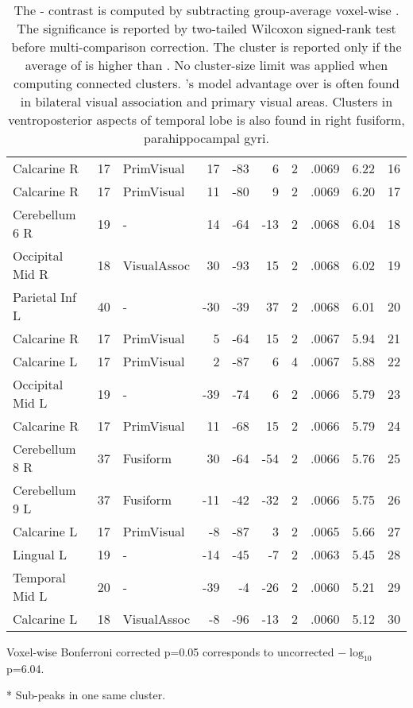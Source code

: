 \begin{table}
\begin{ThreePartTable}
\begin{tabularx}{\textwidth}{l l p{1.5cm} *{3}{r} *{2}{P{.8cm}} P{1.3cm} P{.5cm}}
Calcarine R & 17 & PrimVisual & 17 & -83 & 6 & 2 &  .0069  & 6.22 & 16 \\
Calcarine R & 17 & PrimVisual & 11 & -80 & 9 & 2 &  .0069  & 6.20 & 17 \\
Cerebellum 6 R & 19 & - & 14 & -64 & -13 & 2 &  .0068 & 6.04  & 18 \\
\midrule
Occipital Mid R & 18 & VisualAssoc & 30 & -93 & 15 & 2 &  .0068 & 6.02  & 19 \\
Parietal Inf L & 40 & - & -30 & -39 & 37 & 2 &  .0068 & 6.01 & 20 \\
Calcarine R & 17 & PrimVisual & 5 & -64 & 15 & 2 &  .0067& 5.94  & 21 \\
Calcarine L & 17 & PrimVisual & 2 & -87 & 6 & 4 &  .0067 & 5.88 & 22 \\
Occipital Mid L & 19 & - & -39 & -74 & 6 & 2 &  .0066 & 5.79 & 23 \\
Calcarine R & 17 & PrimVisual & 11 & -68 & 15 & 2 &  .0066 & 5.79 & 24 \\
Cerebellum 8 R & 37 & Fusiform & 30 & -64 & -54 & 2 &  .0066 & 5.76 & 25 \\
Cerebellum 9 L & 37 & Fusiform & -11 & -42 & -32 & 2 &  .0066 & 5.75& 26 \\
Calcarine L & 17 & PrimVisual & -8 & -87 & 3 & 2 &  .0065 & 5.66 & 27 \\
Lingual L & 19 & - & -14 & -45 & -7 & 2 &  .0063 & 5.45 & 28 \\
Temporal Mid L & 20 & - & -39 & -4 & -26 & 2 &  .0060 & 5.21 & 29 \\
Calcarine L & 18 & VisualAssoc & -8 & -96 & -13 & 2 &  .0060 & 5.12 & 30 \\
\bottomrule
    \end{tabularx}
    \begin{tablenotes}
        \footnotesize
        \item[] Voxel-wise Bonferroni corrected p=0.05 corresponds to uncorrected \(-\log_{10}\) p=6.04.
        \item[*] Sub-peaks in one same cluster. 
    \end{tablenotes}  
\end{ThreePartTable}
\caption[ Voxel Contrast, , Group]{The - contrast is computed by subtracting group-average voxel-wise . The significance is reported by two-tailed Wilcoxon signed-rank test before multi-comparison correction. The cluster is reported only if the average  of  is higher than . No cluster-size limit was applied when computing connected clusters. 's model advantage over  is often found in bilateral visual association and primary visual areas. Clusters in ventroposterior aspects of temporal lobe is also found in right fusiform, parahippocampal gyri. \label{tab:simasnContrastClusters_asn}}
\end{table}



